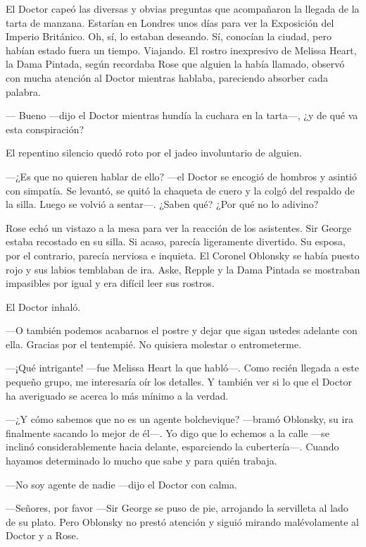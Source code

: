 {El Doctor capeó las diversas y obvias preguntas que acompañaron la
	llegada de la tarta de manzana. Estarían en Londres unos días para ver
	la Exposición del Imperio Británico. Oh, sí, lo estaban deseando. Sí,
	conocían la ciudad, pero habían estado fuera un tiempo. Viajando. El
	rostro inexpresivo de Melissa Heart, la Dama Pintada, según recordaba
	Rose que alguien la había llamado, observó con mucha atención al Doctor
mientras hablaba, pareciendo absorber cada palabra.}

{--- Bueno ---dijo el Doctor mientras hundía la cuchara en la tarta---,
¿y de qué va esta conspiración?}

{El repentino silencio quedó roto por el jadeo involuntario de alguien.}

{---¿Es que no quieren hablar de ello? ---el Doctor se encogió de
	hombros y asintió con simpatía. Se levantó, se quitó la chaqueta de
	cuero y la colgó del respaldo de la silla. Luego se volvió a sentar---.
¿Saben qué? ¿Por qué no lo adivino?}

{Rose echó un vistazo a la mesa para ver la reacción de los asistentes.
	Sir George estaba recostado en su silla. Si acaso, parecía ligeramente
	divertido. Su esposa, por el contrario, parecía nerviosa e inquieta. El
	Coronel Oblonsky se había puesto rojo y sus labios temblaban de ira.
	Aske, Repple y la Dama Pintada se mostraban impasibles por igual y era
difícil leer sus rostros.}

{El Doctor inhaló.}

{---O también podemos acabarnos el postre y dejar que sigan ustedes
	adelante con ella. Gracias por el tentempié. No quisiera molestar o
entrometerme.}

{---¡Qué intrigante! ---fue Melissa Heart la que habló---. Como recién
	llegada a este pequeño grupo, me interesaría oír los detalles. Y también
	ver si lo que el Doctor ha averiguado se acerca lo más mínimo a la
verdad.}

{---¿Y cómo sabemos que no es un agente bolchevique? ---bramó Oblonsky,
	su ira finalmente sacando lo mejor de él---. Yo digo que lo echemos a la
	calle ---se inclinó considerablemente hacia delante, esparciendo la
	cubertería---. Cuando hayamos determinado lo mucho que sabe y para quién
trabaja.}

{---No soy agente de nadie ---dijo el Doctor con calma.}

{---Señores, por favor ---Sir George se puso de pie, arrojando la
	servilleta al lado de su plato. Pero Oblonsky no prestó atención y
siguió mirando malévolamente al Doctor y a Rose.}

